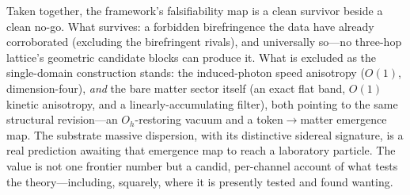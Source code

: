 Taken together, the framework's falsifiability map is a clean survivor beside a clean
no-go. What survives: a forbidden birefringence the data have already corroborated
(excluding the birefringent rivals), and universally so---no three-hop lattice's geometric
candidate blocks can produce it. What is excluded as the single-domain construction stands: the induced-photon speed
anisotropy ($O(1)$, dimension-four), \emph{and} the bare matter sector itself (an exact
flat band, $O(1)$ kinetic anisotropy, and a linearly-accumulating filter), both pointing to
the same structural revision---an $O_h$-restoring vacuum and a token$\to$matter emergence
map. The substrate massive dispersion, with its distinctive sidereal signature, is a real
prediction awaiting that emergence map to reach a laboratory particle. The value is not one
frontier number but a candid, per-channel account of what tests the theory---including,
squarely, where it is presently tested and found wanting.
